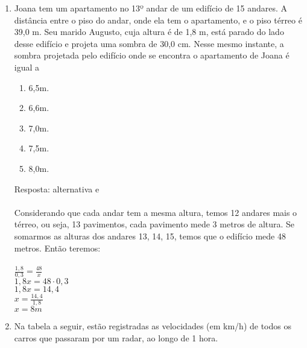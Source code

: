 \documentclass[a4paper,14pt]{article}
\begin{document}
\begin{enumerate}
        \item Joana tem um apartamento no 13º andar de um edifício de 15 andares. A distância entre o piso do andar,
        onde ela tem o apartamento, e o piso térreo é 39,0 m. Seu marido Augusto, cuja altura é de 1,8 m, está
        parado do lado desse edifício e projeta uma sombra de 30,0 cm.
        Nesse mesmo instante, a sombra projetada pelo edifício onde se encontra o apartamento de Joana é igual a 
        \begin{enumerate}
        	\item 6,5m.
        	\item 6,6m.
        	\item 7,0m.
        	\item 7,5m.
        	\item 8,0m.
        \end{enumerate}
		Resposta: alternativa e
		\\
		\\
		Considerando que cada andar tem a mesma altura, temos 12 andares mais o térreo, ou seja, 13 pavimentos, cada pavimento mede 3 metros de altura. Se somarmos as alturas dos andares 13, 14, 15, temos que o edifício mede 48 metros. Então teremos:
		\\
		\\
		$\frac{1,8}{0,3} = \frac{48}{x}$ \\
		$1,8x = 48 \cdot 0,3$ \\
		$1,8x = 14,4$ \\
		$x = \frac{14,4}{1,8}$ \\
		$x = 8m$ \\
        
        \vspace{4cm}
        
        \item Na tabela a seguir, estão registradas as velocidades (em km/h) de todos os carros que passaram por um
        radar, ao longo de 1 hora.
        

\end{enumerate}
\end{document}
